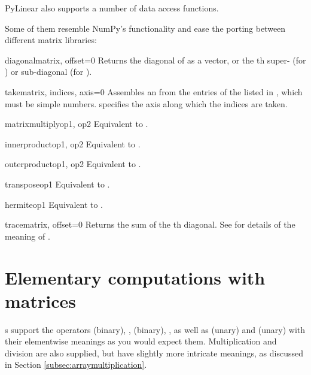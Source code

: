 PyLinear also supports a number of data access functions.

Some of them resemble NumPy's functionality and ease the porting between
different matrix libraries:

\begin{funcdesc}{diagonal}{matrix, offset=0}
  Returns the diagonal of  as a vector, or the th
  super- (for ) or sub-diagonal (for ).
\end{funcdesc}
\begin{funcdesc}{take}{matrix, indices, axis=0}
  Assembles an  from the entries of the 
  listed in , which must be simple numbers. 
  specifies the axis along which the indices are taken.
\end{funcdesc}
\begin{funcdesc}{matrixmultiply}{op1, op2}
  Equivalent to .
\end{funcdesc}
\begin{funcdesc}{innerproduct}{op1, op2}
  Equivalent to .
\end{funcdesc}
\begin{funcdesc}{outerproduct}{op1, op2}
  Equivalent to .
\end{funcdesc}
\begin{funcdesc}{transpose}{op1}
  Equivalent to .
\end{funcdesc}
\begin{funcdesc}{hermite}{op1}
  Equivalent to .
\end{funcdesc}
\begin{funcdesc}{trace}{matrix, offset=0}
  Returns the sum of the th diagonal. See 
  for details of the meaning of .
\end{funcdesc}
\section{Elementary computations with matrices}
s support the operators \code{+} (binary), \code{+=},
\code{-} (binary), \code{-=}, as well as \code{+} (unary) and \code{-}
(unary) with their elementwise meanings as you would expect them.
Multiplication and division are also supplied, but have slightly more
intricate meanings, as discussed in Section
\ref{subsec:arraymultiplication}.

